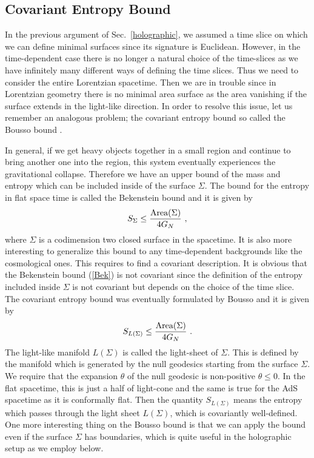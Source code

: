 \documentclass[12pt]{article}
\def\frac#1#2{{#1\over #2}}
\def\frac#1#2{{#1\over #2}}
\begin{document}
\subsection{Covariant Entropy Bound}
\hspace{5mm}
In the previous argument of Sec.\ \ref{holographic}, we assumed a time slice on which we can
define minimal surfaces since its signature is Euclidean. However,
in the time-dependent case there is no longer a natural choice of
the time-slices as we have infinitely many different ways of
defining the time slices. Thus we need to consider the entire
Lorentzian spacetime. Then we are in trouble
since in Lorentzian
geometry there is no minimal area surface as the area vanishing if
the surface extends in the light-like direction. In order to resolve
this issue, let us remember an analogous problem; the covariant
entropy bound so called the Bousso bound \cite{Bousso}.

In general, if we get heavy objects together in a small region and
continue to bring another one into the region, this system
eventually experiences the gravitational collapse. Therefore we have
an upper bound of the mass and entropy which can be included inside
of the surface $\Sigma$. The bound for the entropy in flat space
time is called the Bekenstein bound and it is given by
\begin{equation}\label{Bek}
S_{\Sigma}\leq \frac{\mbox{Area}(\Sigma)}{4G_N}\ ,
\end{equation}
 where $\Sigma$ is a
codimension two closed surface in the spacetime. It is also more
interesting to generalize this bound to any time-dependent
backgrounds like the cosmological ones. This requires to find a
covariant description. It is obvious that the Bekenstein bound
(\ref{Bek}) is not covariant since the definition of the entropy
included inside $\Sigma$ is not covariant but depends on the choice
of the time slice. The covariant entropy bound was eventually
formulated by Bousso \cite{Bousso} and it is given by
\begin{equation}\label{bousso}
S_{L(\Sigma)}\leq \frac{\mbox{Area}(\Sigma)}{4G_N}\ .
\end{equation}
The light-like manifold $L(\Sigma)$ is called the light-sheet of
$\Sigma$. This is defined by the manifold which is generated by the
null geodesics starting from the surface $\Sigma$. We require that
the expansion $\theta$ of the null geodesic is non-positive
$\theta\leq 0$. In the flat spacetime, this is just a half of
light-cone and the same is true for the AdS spacetime as it is
conformally flat. Then the quantity $S_{L(\Sigma)}$ means the
entropy which passes
through the light sheet $L(\Sigma)$, which is
covariantly well-defined.
One more interesting thing on
the Bousso bound is that we can apply the bound even if the surface $\Sigma$
has boundaries, which is quite useful in the holographic setup as we
employ below.
\end{document}
